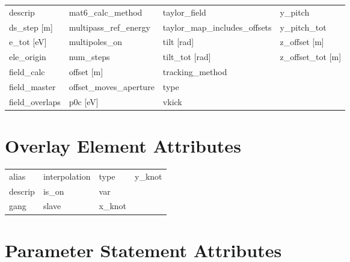 \begin{tabular}{llll}
descrip                          & mat6_calc_method                 & taylor_field                     & y_pitch                          \\
ds_step [m]                      & multipass_ref_energy             & taylor_map_includes_offsets      & y_pitch_tot                      \\
e_tot [eV]                       & multipoles_on                    & tilt [rad]                       & z_offset [m]                     \\
ele_origin                       & num_steps                        & tilt_tot [rad]                   & z_offset_tot [m]                 \\
field_calc                       & offset [m]                       & tracking_method                  &                                  \\
field_master                     & offset_moves_aperture            & type                             &                                  \\
field_overlaps                   & p0c [eV]                         & vkick                            &                                  \\
 \bottomrule
 \end{tabular}
 \vfill
 
 \section{Overlay Element Attributes}
 \label{s:list.overlay}
 
 \begin{tabular}{llll} \toprule
alias                            & interpolation                    & type                             & y_knot                           \\
descrip                          & is_on                            & var                              &                                  \\
gang                             & slave                            & x_knot                           &                                  \\
 \bottomrule
 \end{tabular}
 \vfill
 
 \section{Parameter Statement Attributes}
 \label{s:list.parameter}
 
